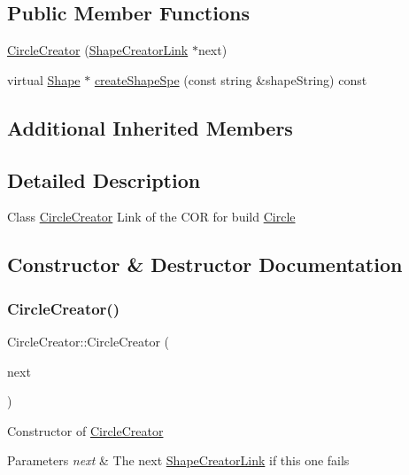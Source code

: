 \subsection*{Public Member Functions}
\begin{DoxyCompactItemize}
\item 
\hyperlink{class_circle_creator_a549730b5da4a9ebc7a814ef823683246}{Circle\+Creator} (\hyperlink{class_shape_creator_link}{Shape\+Creator\+Link} $\ast$next)
\item 
virtual \hyperlink{class_shape}{Shape} $\ast$ \hyperlink{class_circle_creator_ae77dd120e2521fdfb2e002228a1f0c25}{create\+Shape\+Spe} (const string \&shape\+String) const
\end{DoxyCompactItemize}
\subsection*{Additional Inherited Members}


\subsection{Detailed Description}
Class \hyperlink{class_circle_creator}{Circle\+Creator} Link of the C\+OR for build \hyperlink{class_circle}{Circle} 

\subsection{Constructor \& Destructor Documentation}
\hypertarget{class_circle_creator_a549730b5da4a9ebc7a814ef823683246}{}\label{class_circle_creator_a549730b5da4a9ebc7a814ef823683246} 
\subsubsection{\texorpdfstring{Circle\+Creator()}{CircleCreator()}}
{\footnotesize\ttfamily Circle\+Creator\+::\+Circle\+Creator (\begin{DoxyParamCaption}\item[{\hyperlink{class_shape_creator_link}{Shape\+Creator\+Link} $\ast$}]{next }\end{DoxyParamCaption})}

Constructor of \hyperlink{class_circle_creator}{Circle\+Creator} 
\begin{DoxyParams}{Parameters}
{\em next} & The next \hyperlink{class_shape_creator_link}{Shape\+Creator\+Link} if this one fails \\
\hline
\end{DoxyParams}


